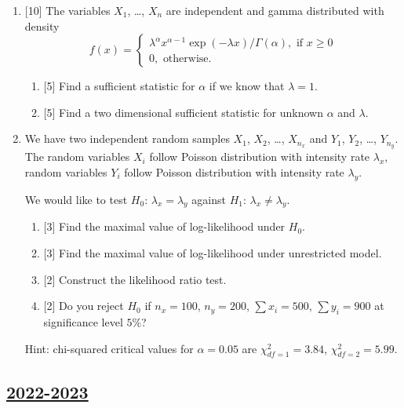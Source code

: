 \begin{enumerate}
    \item {[10]} The variables $X_1$, \ldots, $X_n$ are independent and gamma distributed with density
    \[
    f(x) = \begin{cases}
      \lambda^\alpha x^{\alpha - 1} \exp(-\lambda x) / \Gamma(\alpha), \text{ if } x\geq 0 \\
      0, \text{ otherwise}.
    \end{cases}  
    \]
    \begin{enumerate}
      \item {[5]} Find a sufficient statistic for $\alpha$ if we know that $\lambda = 1$. 
      \item {[5]} Find a two dimensional sufficient statistic for unknown $\alpha$ and $\lambda$. 
    \end{enumerate}

    \item We have two independent random samples $X_1$, $X_2$, \ldots, $X_{n_x}$ and $Y_1$, $Y_2$, \ldots, $Y_{n_y}$.
    The random variables $X_i$ follow Poisson distribution with intensity rate $\lambda_x$, 
    random variables $Y_i$ follow Poisson distribution with intensity rate $\lambda_y$.
  
    We would like to test $H_0$: $\lambda_x = \lambda_y$ against $H_1$: $\lambda_x \neq \lambda_y$.
  
    \begin{enumerate}
      \item {[3]} Find the maximal value of log-likelihood under $H_0$.
      \item {[3]} Find the maximal value of log-likelihood under unrestricted model.
      \item {[2]} Construct the likelihood ratio test. 
      \item {[2]} Do you reject $H_0$ if $n_x = 100$, $n_y = 200$, $\sum x_i = 500$, $\sum y_i = 900$ at
      significance level $5\%$?
    \end{enumerate}
  
    Hint: chi-squared critical values for $\alpha = 0.05$ are $\chi^2_{df=1} = 3.84$, $\chi^2_{df=2} = 5.99$.
  

\end{enumerate}




\subsection[2022-2023]{\hyperref[sec:sol_kr_04_2022_2023]{2022-2023}}
\label{sec:kr_04_2022_2023} %

